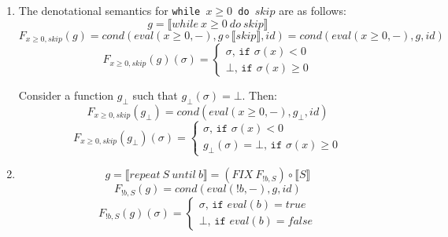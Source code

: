 \documentclass[11pt]{article}
\begin{document}
\begin{enumerate}
	\item The denotational semantics for \texttt{while $x\geq 0$ do $skip$} are as follows:
	\begin{equation*}
		g=\llbracket while\ x\geq 0\ do\ skip\rrbracket
	\end{equation*}
	\begin{equation*}
		F_{x\geq 0,skip}(g) = cond(eval(x\geq 0,-), g\circ \llbracket skip\rrbracket, id) = cond(eval(x\geq0,-),g,id)
	\end{equation*}
	\begin{equation*}
		F_{x\geq 0,skip}(g)(\sigma) = \begin{cases}\sigma\texttt{, if }\sigma(x)<0 \\ \bot\texttt{, if }\sigma(x) \geq 0\end{cases}
	\end{equation*}
	
	Consider a function $g_\bot$ such that $g_\bot(\sigma) = \bot$. Then:
	\begin{equation*}
		F_{x\geq 0,skip}(g_\bot) = cond(eval(x\geq0,-),g_\bot,id)
	\end{equation*}
	\begin{equation*}
		F_{x\geq 0,skip}(g_\bot)(\sigma) = \begin{cases}\sigma\texttt{, if }\sigma(x)<0 \\ g_\bot(\sigma) = \bot\texttt{, if }\sigma(x) \geq 0\end{cases}
	\end{equation*}
	
	\item 
	\begin{equation*}
		g=\llbracket repeat\ S\ until\ b\rrbracket=(FIX\ F_{!b,S})\circ \llbracket S\rrbracket
	\end{equation*}
	\begin{equation*}
		F_{!b,S}(g)=cond(eval(!b,-), g, id)
	\end{equation*}
	\begin{equation*}
		F_{!b,S}(g)(\sigma) = \begin{cases}\sigma\texttt{, if }eval(b)=true\\ \bot\texttt{, if }eval(b)=false\end{cases}
	\end{equation*}
		
	\end{enumerate}
\end{document}
